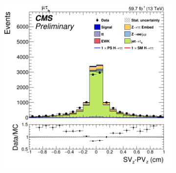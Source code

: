 \begin{figure}
\begin{subfigure}[b]{0.33\linewidth}
    \caption{} 
    \vspace{0.5ex}
  \end{subfigure} 
    \begin{subfigure}[b]{0.33\linewidth}
    \centering
    \includegraphics[width=\linewidth]{Chapitre7/Images/TauFlightZfakes.png} 
    \caption{} 
    \vspace{0.5ex}
  \end{subfigure} 
\end{figure}

